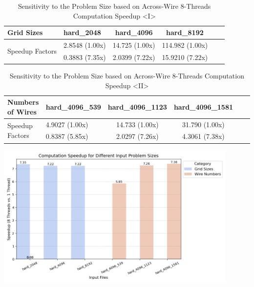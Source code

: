 \documentclass[letterpaper,11pt]{exam}
\begin{document}
\begin{questions}
\begin{enumerate}[label=\roman*.]
              \captionsetup{font=small, labelfont=bf}
              \begin{table}[h!]
                  \centering
                  \caption{Sensitivity to the Problem Size based on Across-Wire 8-Threads Computation Speedup <I>}
                  \begin{tabular}{@{}llcccc@{}}
                      \toprule
                      \textbf{Grid Sizes}              & \textbf{hard\_2048} & \textbf{hard\_4096} & \textbf{hard\_8192} \\
                      \midrule
                      \multirow{2}{*}{Speedup Factors} & 2.8548 (1.00x)      & 14.725 (1.00x)      & 114.982 (1.00x)     \\
                                                       & 0.3883 (7.35x)      & 2.0399 (7.22x)      & 15.9210 (7.22x)     \\
                      \bottomrule
                  \end{tabular}
                  \label{tab:wire_routing_comparison}
              \end{table}

              \captionsetup{font=small, labelfont=bf}
              \begin{table}[h!]
                  \centering
                  \caption{Sensitivity to the Problem Size based on Across-Wire 8-Threads Computation Speedup <II>}
                  \begin{tabular}{@{}llcccc@{}}
                      \toprule
                      \textbf{Numbers of Wires}        & \textbf{hard\_4096\_539} & \textbf{hard\_4096\_1123} & \textbf{hard\_4096\_1581} \\
                      \midrule
                      \multirow{2}{*}{Speedup Factors} & 4.9027 (1.00x)           & 14.733 (1.00x)            & 31.790 (1.00x)            \\
                                                       & 0.8387 (5.85x)           & 2.0297 (7.26x)            & 4.3061 (7.38x)            \\
                      \bottomrule
                  \end{tabular}
                  \label{tab:wire_routing_comparison}
              \end{table}
              \includegraphics*[width=0.9\textwidth]{./img/sensitivity_comparison.png}
    \end{enumerate}


\end{questions}
\end{document}
